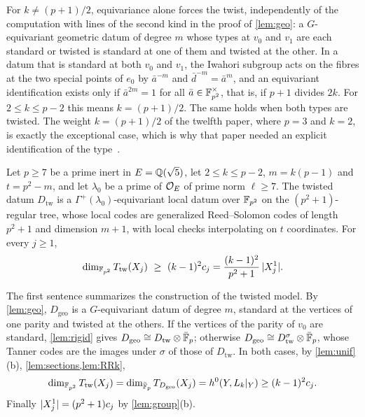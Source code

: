 \begin{remark}\label{rem:forced}
For $k\ne(p+1)/2$, equivariance alone forces the twist, independently of the computation with lines of the second kind
in the proof of \cref{lem:geo}: a $G$-equivariant geometric datum of degree $m$ whose types at $v_0$ and $v_1$ are each
standard or twisted is standard at one of them and twisted at the other. In a datum that is standard at
both $v_0$ and $v_1$, the Iwahori subgroup acts on the fibres at the two special points of $e_0$ by $\bar a^{-m}$ and
$\bar d^{-m}=\bar a^m$, and an equivariant identification exists only if $\bar a^{2m}=1$ for all $\bar a\in\mathbb{F}_{p^2}^\times$,
that is, if $p+1$ divides $2k$. For $2\le k\le p-2$ this means $k=(p+1)/2$. The same holds when both types are twisted.
The weight $k=(p+1)/2$ of the twelfth paper, where $p=3$ and $k=2$, is exactly the exceptional case, which is why that paper
needed an explicit identification of the type~\cite[Lemma~6.9]{Luck2026}.
\end{remark}

\begin{theorem}[Theorem G]\label{thm:G}
\notformalized
Let $p\ge7$ be a prime inert in $E=\mathbb{Q}(\sqrt5)$, let $2\le k\le p-2$, $m=k(p-1)$ and $t=p^2-m$, and let $\lambda_0$ be a
prime of $\mathcal{O}_E$ of prime norm $\ell\ge7$. The twisted datum $D_{\mathrm{tw}}$ is a $\Gamma^+(\lambda_0)$-equivariant local
datum over $\mathbb{F}_{p^2}$ on the $(p^2+1)$-regular tree, whose local codes are generalized Reed--Solomon codes of length
$p^2+1$ and dimension $m+1$, with local checks interpolating on $t$ coordinates. For every $j\ge1$,
\[
  \dim_{\F_{p^2}}T_{\mathrm{tw}}(X_j)\ \ge\ (k-1)^2c_j=\frac{(k-1)^2}{p^2+1}\,\abs{X_j^1}.
\]
\end{theorem}
\begin{informalproof}
The first sentence summarizes the construction of the twisted model. By \cref{lem:geo}, $D_{\mathrm{geo}}$ is a
$G$-equivariant datum of degree $m$, standard at the vertices of one parity and twisted at the others. If the vertices
of the parity of $v_0$ are standard, \cref{lem:rigid} gives $D_{\mathrm{geo}}\cong D_{\mathrm{tw}}\otimes\bar{\mathbb{F}}_p$;
otherwise $D_{\mathrm{geo}}\cong D^\sigma_{\mathrm{tw}}\otimes\bar{\mathbb{F}}_p$, whose Tanner codes are the images under $\sigma$
of those of $D_{\mathrm{tw}}$. In both cases, by \cref{lem:unif}(b), \cref{lem:sections,lem:RRk},
\[
  \dim_{\mathbb{F}_{p^2}}T_{\mathrm{tw}}(X_j)=\dim_{\bar{\mathbb{F}}_p}T_{D_{\mathrm{geo}}}(X_j)=h^0(Y,L_k|_Y)\ge(k-1)^2c_j.
\]
Finally $\lvert X_j^1 \rvert=(p^2+1)c_j$ by \cref{lem:group}(b).
\end{informalproof}

